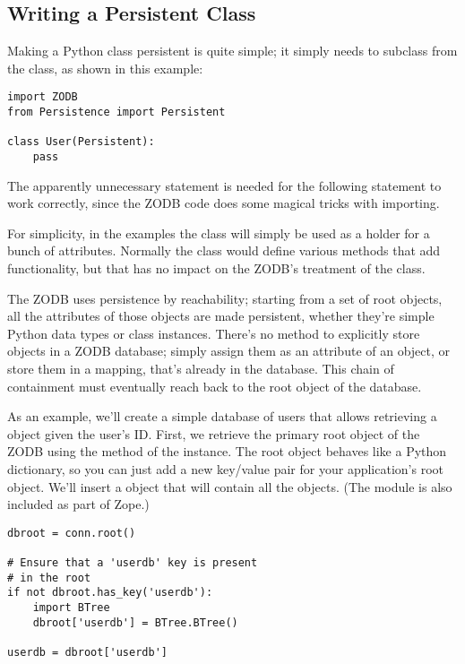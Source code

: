 \subsection{Writing a Persistent Class}

Making a Python class persistent is quite simple; it simply needs to
subclass from the  class, as shown in this example:

\begin{verbatim}
import ZODB
from Persistence import Persistent

class User(Persistent):
    pass
\end{verbatim}

The apparently unnecessary  statement is
needed for the following  statement to work
correctly, since the ZODB code does some magical tricks with
importing.

For simplicity, in the examples the  class will
simply be used as a holder for a bunch of attributes.  Normally the
class would define various methods that add functionality, but that
has no impact on the ZODB's treatment of the class.

The ZODB uses persistence by reachability; starting from a set of root
objects, all the attributes of those objects are made persistent,
whether they're simple Python data types or class instances.  There's
no method to explicitly store objects in a ZODB database; simply
assign them as an attribute of an object, or store them in a mapping,
that's already in the database.  This chain of containment must
eventually reach back to the root object of the database.

As an example, we'll create a simple database of users that allows
retrieving a  object given the user's ID.  First, we
retrieve the primary root object of the ZODB using the 
method of the  instance.  The root object behaves
like a Python dictionary, so you can just add a new key/value pair for
your application's root object.  We'll insert a  object
that will contain all the  objects.  (The
 module is also included as part of Zope.)

\begin{verbatim}
dbroot = conn.root()

# Ensure that a 'userdb' key is present 
# in the root
if not dbroot.has_key('userdb'):
    import BTree
    dbroot['userdb'] = BTree.BTree()

userdb = dbroot['userdb']
\end{verbatim}

